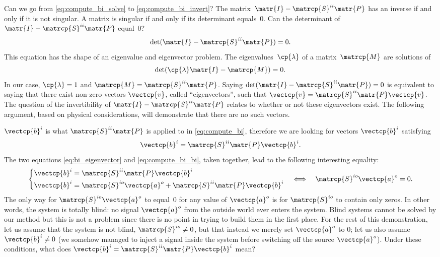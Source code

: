 \begin{refsection}
Can we go from \cref{eq:compute_bi_solve} to \cref{eq:compute_bi_invert}?
The matrix~$\matr{I} - \matrcp{S}^{ii}\matr{P}$ has an inverse if and only if it is not singular.
A matrix is singular if and only if its determinant equals~0.
Can the determinant of~$\matr{I} - \matrcp{S}^{ii}\matr{P}$ equal~0?
\begin{equation}
    \det(\matr{I} - \matrcp{S}^{ii}\matr{P}) = 0
    \text{.}
    \label{eq:det_i_minus_siip}
\end{equation}
This equation has the shape of an eigenvalue and eigenvector problem.
The eigenvalues~$\cp{\lambda}$ of a matrix~$\matrcp{M}$ are solutions of
\begin{equation}
    \det(\cp{\lambda} \matr{I} - \matrcp{M}) = 0 \label{eq:eigenvalue_typical}
    \text{.}
\end{equation}
In our case, $\cp{\lambda}=1$ and $\matrcp{M}=\matrcp{S}^{ii}\matr{P}$.
Saying $\det(\matr{I} - \matrcp{S}^{ii}\matr{P}) = 0$ is equivalent to saying that there exist non-zero vectors $\vectcp{v}$, called ``eigenvectors'',
such that $\vectcp{v} = \matrcp{S}^{ii}\matr{P}\vectcp{v}$.
The question of the invertibility of $\matr{I} - \matrcp{S}^{ii}\matr{P}$ relates to whether or not these eigenvectors exist.
The following argument, based on physical considerations, will demonstrate that there are no such vectors.

$\vectcp{b}^i$ is what $\matrcp{S}^{ii}\matr{P}$ is applied to in \cref{eq:compute_bi}, therefore we are looking for vectors $\vectcp{b}^i$ satisfying
\begin{equation}
    \vectcp{b}^i = \matrcp{S}^{ii}\matr{P} \vectcp{b}^i \text{.} \label{eq:bi_eigenvector}
\end{equation}
The two equations \cref{eq:bi_eigenvector} and  \cref{eq:compute_bi_bi}, taken together, 
lead to the following interesting equality:
\begin{equation}
    \left\lbrace
        \begin{aligned}
            \vectcp{b}^i &= \matrcp{S}^{ii}\matr{P} \vectcp{b}^i \\
            \vectcp{b}^i &= \matrcp{S}^{io}\vectcp{a}^o + \matrcp{S}^{ii}\matr{P} \vectcp{b}^i
        \end{aligned}
    \right.
    \quad
    \Longleftrightarrow
    \quad
    \matrcp{S}^{io}\vectcp{a}^o = 0
    \text{.}
\end{equation}
The only way for $\matrcp{S}^{io}\vectcp{a}^o$ to equal~0 for any value of $\vectcp{a}^o$ is for $\matrcp{S}^{io}$ to contain only zeros.
In other words, the system is totally blind: no signal $\vectcp{a}^o$ from the outside world ever enters the system.
Blind systems cannot be solved by our method but this is not a problem since there is no point in trying to build them in the first place.
For the rest of this demonstration, let us assume that the system is not blind, $\matrcp{S}^{io}\neq 0$, but that instead we merely set $\vectcp{a}^o$ to 0; let us also assume $\vectcp{b}^i \neq 0$ (we somehow managed to inject a signal inside the system before switching off the source $\vectcp{a}^o$).
Under these conditions, what does $\vectcp{b}^i = \matrcp{S}^{ii} \matr{P} \vectcp{b}^i$ mean?


\end{refsection}
